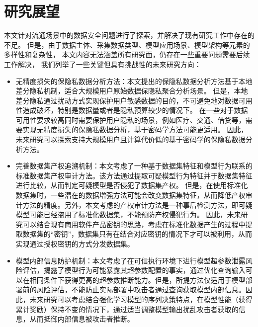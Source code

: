 \section{研究展望}
本文针对流通场景中的数据安全问题进行了探索，并解决了现有研究工作中存在的不足。
但是，由于数据主体、采集数据类型、模型应用场景、模型架构等元素的多样性和复杂性，
本文内容无法涵盖所有研究面，仍存在一些重要问题需要后续工作解决，
我们列举了一些关键但具有挑战性的未来研究方向：
\begin{itemize}
    \item 无精度损失的保隐私数据分析方法：本文提出的保隐私数据分析方法基于本地差分隐私机制，适合大规模用户原始数据保隐私聚合分析场景。
    但是，本地差分隐私通过扰动方式实现保护用户敏感数据的目的，不可避免地对数据可用性造成破坏，特别是数据量或者是隐私预算较少的情况下。
    在一些对于数据可用性要求较高同时需要保护用户隐私的场景，例如医疗、交通、借贷等，需要实现无精度损失的保隐私数据分析，基于密码学方法可能更适用。
    因此，未来研究可以探索支持大规模用户且计算代价低的基于密码学的保隐私数据分析方法。
    \item 完善数据集产权追溯机制：本文考虑了一种基于数据集特征和模型行为联系的标准数据集产权审计方法。该方法通过提取可疑模型行为特征并于数据集特征进行比较，从而判定可疑模型是否侵犯了数据集产权。
    但是，在使用标准化数据集时，一些潜在的数据增强方法可能会改变数据集特征，从而降低产权审计方法的精度。另外，本文考虑的产权审计方法是一种事后检测方法，即可疑模型可能已经盗用了标准化数据集，不能预防产权侵犯行为。
    因此，未来研究可以结合现有商用软件产品密钥的思路，考虑在标准化数据产生的过程中提取数据集的“密钥”，数据集只有在结合对应密钥的情况下才可以被利用，从而实现通过授权密钥的方式分发数据集。
    \item 模型内部信息防护机制：本文考虑了在可信执行环境下进行模型超参数泄露风险评估，揭露了模型行为可能暴露其超参数配置的事实，通过优化查询输入可以在相同条件下获得更高的超参数推断能力。但是，所提方法仅适用于模型部署前的风险评估，不能防止实际部署中攻击者通过查询获取模型内部信息。因此，未来研究可以考虑结合强化学习模型的序列决策特点，在模型性能（获得累计奖励）保持不变的情况下，通过适当调整模型输出扰乱攻击者获取的信息，从而抵御内部信息被攻击者推断。

\end{itemize}
